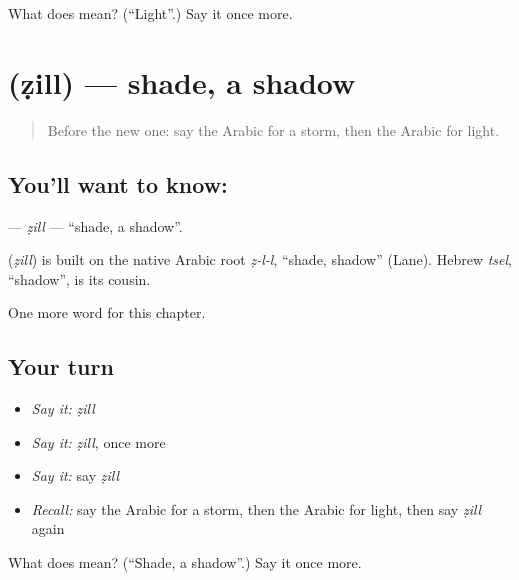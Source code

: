 \begin{tcolorbox}[breakable,colback=teal!4,colframe=teal!35!black,title={Before you move on}]
What does  mean? (\textquotedblleft{}Light\textquotedblright{}.) Say it once more.
\end{tcolorbox}
\section[\texorpdfstring{\ar{ظل} (ẓill)}{ظل (ẓill)}]{ (ẓill) — shade, a shadow}

\label{lesson:AR-C134-zill}



\begin{quote}
Before the new one: say the Arabic for a storm, then the Arabic for light.
\end{quote}

\subsection*{You'll want to know: }
\textbf{} — \emph{ẓill} — \textquotedblleft{}shade, a shadow\textquotedblright{}.

\begin{cousinweb}
\textbf{} (\emph{ẓill}) is built on the native Arabic root \emph{ẓ-l-l}, \textquotedblleft{}shade, shadow\textquotedblright{} (Lane). Hebrew \emph{tsel}, \textquotedblleft{}shadow\textquotedblright{}, is its cousin.
\end{cousinweb}

\begin{grammarlens}[title={What you've built}]
One more word for this chapter.
\end{grammarlens}

\subsection*{Your turn}
\begin{itemize}
\raggedright
  \item \emph{Say it:} \emph{ẓill}
  \item \emph{Say it:} \emph{ẓill}, once more
  \item \emph{Say it:} say \emph{ẓill}
  \item \emph{Recall:} say the Arabic for a storm, then the Arabic for light, then say \emph{ẓill} again
\end{itemize}

\begin{tcolorbox}[breakable,colback=teal!4,colframe=teal!35!black,title={Before you move on}]
What does  mean? (\textquotedblleft{}Shade, a shadow\textquotedblright{}.) Say it once more.
\end{tcolorbox}
